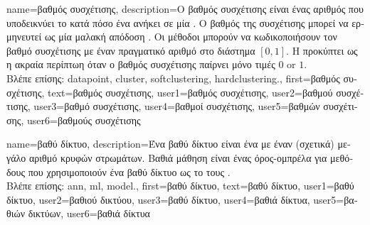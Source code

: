 {name={\foreignlanguage{greek}{βαθμός συσχέτισης}},
	description={\foreignlanguage{greek}{Ο βαθμός συσχέτισης είναι ένας αριθμός που υποδεικνύει} 
		\foreignlanguage{greek}{το κατά πόσο ένα}  
		\foreignlanguage{greek}{ανήκει σε μία}  \cite[\foreignlanguage{greek}{Κεφ.} 8]{MLBasics}. \foreignlanguage{greek}{Ο βαθμός  
		της συσχέτισης μπορεί να ερμηνευτεί ως μία μαλακή απόδοση} . \foreignlanguage{greek}{Οι μέθοδοι} 
		 \foreignlanguage{greek}{μπορούν να κωδικοποιήσουν τον βαθμό συσχέτισης με έναν πραγματικό  
		αριθμό στο διάστημα $[0,1]$. Η}  \foreignlanguage{greek}{προκύπτει ως η ακραία περίπτωη όταν ο βαθμός 
		συσχέτισης παίρνει μόνο τιμές} $0$ or $1$.\\
		\foreignlanguage{greek}{Βλέπε επίσης:} \gls{datapoint}, \gls{cluster}, \gls{softclustering}, \gls{hardclustering}.}, 
	first={\foreignlanguage{greek}{βαθμός συσχέτισης}},
	text={\foreignlanguage{greek}{βαθμός συσχέτισης}},
	user1={\foreignlanguage{greek}{βαθμός συσχέτισης}}, %
    	user2={\foreignlanguage{greek}{βαθμού συσχέτισης}}, %
	user3={\foreignlanguage{greek}{βαθμό συσχέτισης}}, %
    	user4={\foreignlanguage{greek}{βαθμοί συσχέτισης}}, %
	user5={\foreignlanguage{greek}{βαθμών συσχέτισης}}, %
    	user6={\foreignlanguage{greek}{βαθ\-μούς συσχέτισης}} %
}

{name={\foreignlanguage{greek}{βαθύ δίκτυο}},
	description={\foreignlanguage{greek}{Ένα βαθύ δίκτυο είναι ένα} 
		 \foreignlanguage{greek}{με έναν (σχετικά) μεγάλο αριθμό κρυφών στρωμάτων.  
		Βαθιά μάθηση είναι ένας όρος-ομπρέλα για μεθόδους}  \foreignlanguage{greek}{που 
		χρησιμοποιούν ένα βαθύ δίκτυο ως το}  \foreignlanguage{greek}{τους} \cite{Goodfellow-et-al-2016}.\\
		\foreignlanguage{greek}{Βλέπε επίσης:} \gls{ann}, \gls{ml}, \gls{model}.},
	first={\foreignlanguage{greek}{βαθύ δίκτυο}},
	text={\foreignlanguage{greek}{βαθύ δίκτυο}},
	user1={\foreignlanguage{greek}{βαθύ δίκτυο}}, %
	user2={\foreignlanguage{greek}{βαθιού δικτύου}}, %
	user3={\foreignlanguage{greek}{βαθύ δίκτυο}}, %
	user4={\foreignlanguage{greek}{βαθιά δίκτυα}}, %
	user5={\foreignlanguage{greek}{βαθιών δικτύων}}, %
	user6={\foreignlanguage{greek}{βαθιά δίκτυα}} %
}

